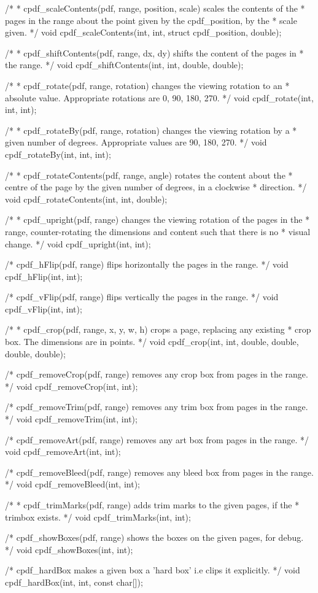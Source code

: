 /*
 * cpdf_scaleContents(pdf, range, position, scale) scales the contents of the
 * pages in the range about the point given by the cpdf_position, by the
 * scale given.
 */
void cpdf_scaleContents(int, int, struct cpdf_position, double);

/*
 * cpdf_shiftContents(pdf, range, dx, dy) shifts the content of the pages in
 * the range.
 */
void cpdf_shiftContents(int, int, double, double);

/*
 * cpdf_rotate(pdf, range, rotation) changes the viewing rotation to an
 * absolute value. Appropriate rotations are 0, 90, 180, 270.
 */
void cpdf_rotate(int, int, int);

/*
 * cpdf_rotateBy(pdf, range, rotation) changes the viewing rotation by a
 * given number of degrees. Appropriate values are 90, 180, 270.
 */
void cpdf_rotateBy(int, int, int);

/*
 * cpdf_rotateContents(pdf, range, angle) rotates the content about the
 * centre of the page by the given number of degrees, in a clockwise
 * direction.
 */
void cpdf_rotateContents(int, int, double);

/*
 * cpdf_upright(pdf, range) changes the viewing rotation of the pages in the
 * range, counter-rotating the dimensions and content such that there is no
 * visual change.
 */
void cpdf_upright(int, int);

/* cpdf_hFlip(pdf, range) flips horizontally the pages in the range. */
void cpdf_hFlip(int, int);

/* cpdf_vFlip(pdf, range) flips vertically the pages in the range. */
void cpdf_vFlip(int, int);

/*
 * cpdf_crop(pdf, range, x, y, w, h) crops a page, replacing any existing
 * crop box. The dimensions are in points.
 */
void cpdf_crop(int, int, double, double, double, double);

/* cpdf_removeCrop(pdf, range) removes any crop box from pages in the range. */
void cpdf_removeCrop(int, int);

/* cpdf_removeTrim(pdf, range) removes any trim box from pages in the range. */
void cpdf_removeTrim(int, int);

/* cpdf_removeArt(pdf, range) removes any art box from pages in the range. */
void cpdf_removeArt(int, int);

/* cpdf_removeBleed(pdf, range) removes any bleed box from pages in the range. */
void cpdf_removeBleed(int, int);

/*
 * cpdf_trimMarks(pdf, range) adds trim marks to the given pages, if the
 * trimbox exists.
 */
void cpdf_trimMarks(int, int);

/* cpdf_showBoxes(pdf, range) shows the boxes on the given pages, for debug. */
void cpdf_showBoxes(int, int);

/* cpdf_hardBox makes a given box a 'hard box' i.e clips it explicitly. */
void cpdf_hardBox(int, int, const char[]);

